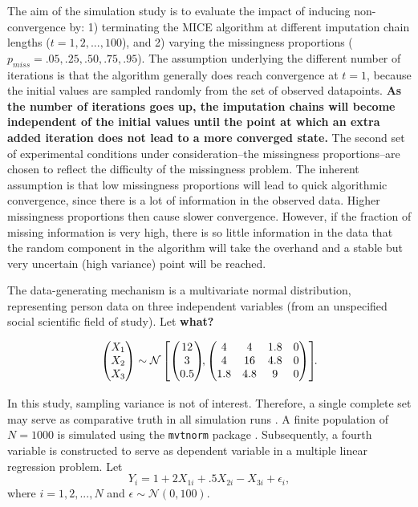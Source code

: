 \documentclass[Royal,times,sageh]{sagej}
\begin{document}
The aim of the simulation study is to evaluate the impact of inducing
non-convergence by: 1) terminating the MICE algorithm at different
imputation chain lengths (\(t = 1, 2,..., 100\)), and 2) varying the
missingness proportions (\(p_{miss} =.05,.25,.50,.75,.95\)). The
assumption underlying the different number of iterations is that the
algorithm generally does reach convergence at \(t=1\), because the
initial values are sampled randomly from the set of observed datapoints.
\textbf{As the number of iterations goes up, the imputation chains will
become independent of the initial values until the point at which an
extra added iteration does not lead to a more converged state.} The
second set of experimental conditions under consideration--the
missingness proportions--are chosen to reflect the difficulty of the
missingness problem. The inherent assumption is that low missingness
proportions will lead to quick algorithmic convergence, since there is a
lot of information in the observed data. Higher missingness proportions
then cause slower convergence. However, if the fraction of missing
information is very high, there is so little information in the data
that the random component in the algorithm will take the overhand and a
stable but very uncertain (high variance) point will be reached.

The data-generating mechanism is a multivariate normal distribution,
representing person data on three independent variables (from an
unspecified social scientific field of study). Let \textbf{what?}

\begin{align*}
\begin{pmatrix}X_1\\
X_2\\
X_3
\end{pmatrix} \sim \mathcal{N}
\begin{bmatrix}
\begin{pmatrix}
12\\
3\\
0.5
\end{pmatrix}\!\!,
\begin{pmatrix}
4 & 4 & 1.8 & 0\\
4 & 16 & 4.8 & 0\\
1.8 & 4.8 & 9 & 0
\end{pmatrix}
\end{bmatrix}\!\!\text{.}\\[2\jot]
\end{align*} In this study, sampling variance is not of interest.
Therefore, a single complete set may serve as comparative truth in all
simulation runs \citep{vink14}. A finite population of \(N=1000\) is
simulated using the \texttt{mvtnorm} package \citep{mvtnorm}.
Subsequently, a fourth variable is constructed to serve as dependent
variable in a multiple linear regression problem. Let \[
Y_i = 1 + 2X_{1i} +.5X_{2i} - X_{3i} + \epsilon_i ,
\] where \(i = 1, 2,..., N\) and \(\epsilon \sim \mathcal{N}(0, 100)\).
\end{document}
